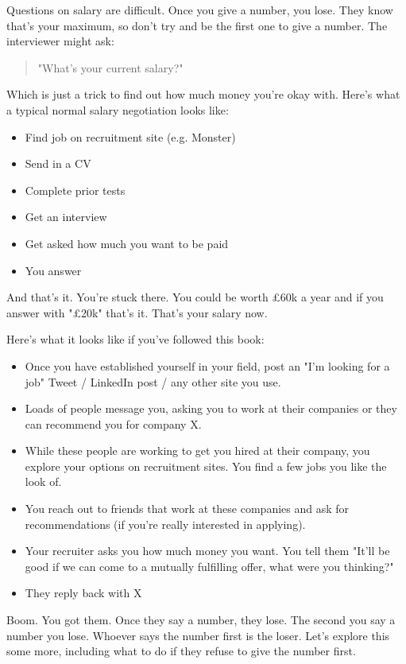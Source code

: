 \documentclass{article}
\begin{document}
Questions on salary are difficult. Once you give a number, you lose.
They know that's your maximum, so don't try and be the first one to give
a number. The interviewer might ask:

\begin{quote}
    "What's your current salary?"
\end{quote}
Which is just a trick to find out how much money you're okay with.
Here's what a typical normal salary negotiation looks like:

\begin{itemize}
\item
  Find job on recruitment site (e.g. Monster)
\item
  Send in a CV
\item
  Complete prior tests
\item
  Get an interview
\item
  Get asked how much you want to be paid
\item
  You answer
\end{itemize}

And that's it. You're stuck there. You could be worth £60k a year and if
you answer with "£20k" that's it. That's your salary now.

Here's what it looks like if you've followed this book:

\begin{itemize}
\item
  Once you have established yourself in your field, post an "I'm
  looking for a job" Tweet / LinkedIn post / any other site you use.
\item
  Loads of people message you, asking you to work at their companies or
  they can recommend you for company X.
\item
  While these people are working to get you hired at their company, you
  explore your options on recruitment sites. You find a few jobs you
  like the look of.
\item
  You reach out to friends that work at these companies and ask for
  recommendations (if you're really interested in applying).
\item
  Your recruiter asks you how much money you want. You tell them "It'll
  be good if we can come to a mutually fulfilling offer, what were you
  thinking?"
\item
  They reply back with X
\end{itemize}

Boom. You got them. Once they say a number, they lose. The second you
say a number you lose. Whoever says the number first is the loser. Let's
explore this some more, including what to do if they refuse to give the
number first.
\end{document}
